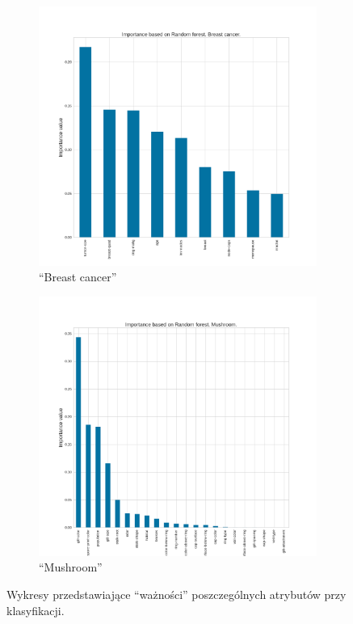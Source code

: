 \begin{figure}[h!]
	\centering
	\begin{subfigure}[b]{0.6\linewidth}
		\includegraphics[width=\linewidth]{photos/importances_bre.png}
		\caption{``Breast cancer''}
	\end{subfigure}
	\begin{subfigure}[b]{0.6\linewidth}
		\includegraphics[width=\linewidth]{photos/importances_mush.png}
		\caption{``Mushroom''}
	\end{subfigure}
        \caption{Wykresy przedstawiające ``ważności'' poszczególnych atrybutów przy klasyfikacji.}
\end{figure}
\clearpage

